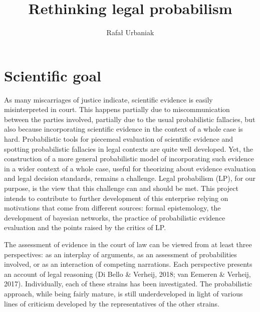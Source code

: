 \documentclass[11pt,dvipsnames,enabledeprecatedfontcommands]{scrartcl}
\title{Rethinking legal probabilism}
\author{Rafał Urbaniak}
\date{}
\begin{document}
\maketitle

\thispagestyle{empty}

\section{Scientific goal}\label{scientific-goal}

As many miscarriages of justice indicate, scientific evidence is easily
misinterpreted in court. This happens partially due to miscommunication
between the parties involved, partially due to the usual probabilistic
fallacies, but also because incorporating scientific evidence in the
context of a whole case is hard. Probabilistic tools for piecemeal
evaluation of scientific evidence and spotting probabilistic fallacies
in legal contexts are quite well developed. Yet, the construction of a
more general probabilistic model of incorporating such evidence in a
wider context of a whole case, useful for theorizing about evidence
evaluation and legal decision standards, remains a challenge. Legal
probabilism (LP), for our purpose, is the view that this challenge can
and should be met. This project intends to contribute to further
development of this enterprise relying on motivations that come from
different sources: formal epistemology, the development of bayesian
networks, the practice of probabilistic evidence evaluation and the
points raised by the critics of LP.

The assessment of evidence in the court of law can be viewed from at
least three perspectives: as an interplay of arguments, as an assessment
of probabilities involved, or as an interaction of competing narrations.
Each perspective presents an account of legal reasoning (Di Bello \&
Verheij, 2018; van Eemeren \& Verheij, 2017). Individually, each of
these strains has been investigated. The probabilistic approach, while
being fairly mature, is still underdeveloped in light of various lines
of criticism developed by the representatives of the other strains.
\end{document}
